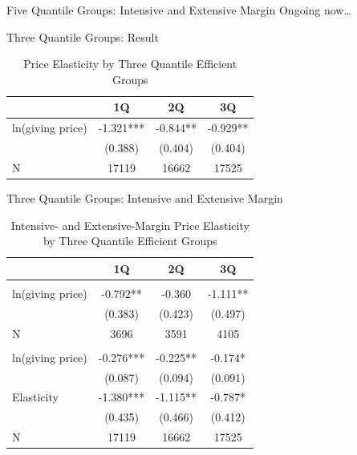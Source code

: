 \documentclass[
  ignorenonframetext,
]{beamer}
\begin{document}
\begin{frame}{Five Quantile Groups: Intensive and Extensive Margin}
\protect\hypertarget{five-quantile-groups-intensive-and-extensive-margin-1}{}
Ongoing now\ldots{}
\end{frame}

\begin{frame}{Three Quantile Groups: Result}
\protect\hypertarget{three-quantile-groups-result-1}{}
\begin{table}

\caption{\label{tab:kableEstimateElasticityByEfficientGroup3}Price Elasticity by Three Quantile Efficient Groups}
\centering
\begin{tabular}[t]{lccc}
\toprule
 & 1Q & 2Q & 3Q\\
\midrule
ln(giving price) & -1.321*** & -0.844** & -0.929**\\
 & (0.388) & (0.404) & (0.404)\\
N & 17119 & 16662 & 17525\\
\bottomrule
\end{tabular}
\end{table}
\end{frame}

\begin{frame}{Three Quantile Groups: Intensive and Extensive Margin}
\protect\hypertarget{three-quantile-groups-intensive-and-extensive-margin-1}{}
\begin{table}

\caption{\label{tab:kableEstimateElasticityIntExtByEfficientGroup3}Intensive- and Extensive-Margin Price Elasticity by Three Quantile Efficient Groups}
\centering
\begin{tabular}[t]{lccc}
\toprule
 & 1Q & 2Q & 3Q\\
\midrule
\addlinespace[0.3em]
\multicolumn{4}{l}{\textbf{Intensive Margin}}\\
\hspace{1em}ln(giving price) & -0.792** & -0.360 & -1.111**\\
\hspace{1em} & (0.383) & (0.423) & (0.497)\\
\hspace{1em}N & 3696 & 3591 & 4105\\
\addlinespace[0.3em]
\multicolumn{4}{l}{\textbf{Extensive Margin}}\\
\hspace{1em}ln(giving price) & -0.276*** & -0.225** & -0.174*\\
\hspace{1em} & (0.087) & (0.094) & (0.091)\\
\hspace{1em}Elasticity & -1.380*** & -1.115** & -0.787*\\
\hspace{1em} & (0.435) & (0.466) & (0.412)\\
\hspace{1em}N & 17119 & 16662 & 17525\\
\bottomrule
\end{tabular}
\end{table}
\end{frame}
\end{document}
